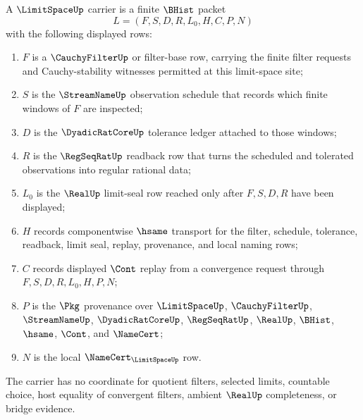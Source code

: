 \begin{definition}
\label{def:limit-space-carrier}
A $\LimitSpaceUp$ carrier is a finite $\BHist$ packet
$$
L=(F,S,D,R,L_0,H,C,P,N)
$$
with the following displayed rows:
\begin{enumerate}
\item $F$ is a $\CauchyFilterUp$ or filter-base row, carrying the finite filter requests and Cauchy-stability witnesses permitted at this limit-space site;
\item $S$ is the $\StreamNameUp$ observation schedule that records which finite windows of $F$ are inspected;
\item $D$ is the $\DyadicRatCoreUp$ tolerance ledger attached to those windows;
\item $R$ is the $\RegSeqRatUp$ readback row that turns the scheduled and tolerated observations into regular rational data;
\item $L_0$ is the $\RealUp$ limit-seal row reached only after $F,S,D,R$ have been displayed;
\item $H$ records componentwise $\hsame$ transport for the filter, schedule, tolerance, readback, limit seal, replay, provenance, and local naming rows;
\item $C$ records displayed $\Cont$ replay from a convergence request through $F,S,D,R,L_0,H,P,N$;
\item $P$ is the $\Pkg$ provenance over $\LimitSpaceUp$, $\CauchyFilterUp$, $\StreamNameUp$, $\DyadicRatCoreUp$, $\RegSeqRatUp$, $\RealUp$, $\BHist$, $\hsame$, $\Cont$, and $\NameCert$;
\item $N$ is the local $\NameCert_{\LimitSpaceUp}$ row.
\end{enumerate}
The carrier has no coordinate for quotient filters, selected limits, countable choice, host equality of convergent filters, ambient $\RealUp$ completeness, or bridge evidence.
\end{definition}

